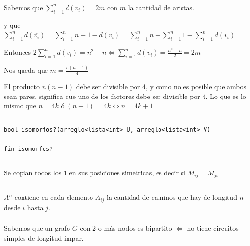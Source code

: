 \subsubsection{}

Sabemos que $\sum_{i = 1}^{n}d(v_i) = 2m$ con $m$ la cantidad de aristas.

y que $\sum_{i = 1}^{n}d(\overline{v_i}) = \sum_{i = 1}^{n}n - 1 - d(v_i) = \sum_{i = 1}^{n}n - \sum_{i = 1}^{n}1 - \sum_{i = 1}^{n}d(v_i)$ 

Entonces $2\sum_{i = 1}^{n}d(v_i) = n^2 - n \Longleftrightarrow \sum_{i = 1}^{n}d(v_i) = \frac{n^2 - n}{2} = 2m$

Nos queda que $m = \frac{n(n - 1)}{4}$

El producto $n(n - 1)$ debe ser divisible por 4, y como no es posible que ambos sean pares, significa que uno de los factores debe ser divisible por 4. Lo que es lo mismo que $n = 4k$ ó $(n - 1) = 4k \Longleftrightarrow n = 4k + 1$

\subsection{}

\begin{codesnippet}
\begin{verbatim}
bool isomorfos?(arreglo<lista<int> U, arreglo<lista<int> V)

fin isomorfos?
\end{verbatim}
\end{codesnippet}

\subsection{}

Se copian todos los 1 en sus posiciones simetricas, es decir si $M_{ij} = M_{ji}$

\subsection{}

\subsubsection{}
$A^n$ contiene en cada elemento $A_{ij}$ la cantidad de caminos que hay de longitud $n$ desde $i$ hasta $j$.

\subsubsection{}
Sabemos que un grafo $G$ con 2 o más nodos es bipartito $\Longleftrightarrow$ no tiene circuitos simples de longitud impar.

